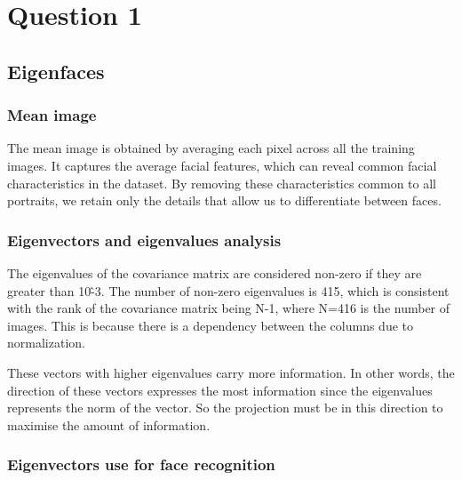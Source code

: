 
\section{Question 1}

\subsection{Eigenfaces}

\subsubsection{Mean image}

The mean image is obtained by averaging each pixel across all the training images. It captures the average facial features, which can reveal common facial characteristics in the dataset. By removing these characteristics common to all portraits, we retain only the details that allow us to differentiate between faces.

\subsubsection{Eigenvectors and eigenvalues analysis}

The eigenvalues of the covariance matrix are considered non-zero if they are greater than 10\^-3. The number of non-zero eigenvalues is 415, which is consistent with the rank of the covariance matrix being N-1, where N=416 is the number of images. This is because there is a dependency between the columns due to normalization.

These vectors with higher eigenvalues carry more information. In other words, the direction of these vectors expresses the most information since the eigenvalues represents the norm of the vector. So the projection must be in this direction to maximise the amount of information.


\subsubsection{Eigenvectors use for face recognition}

